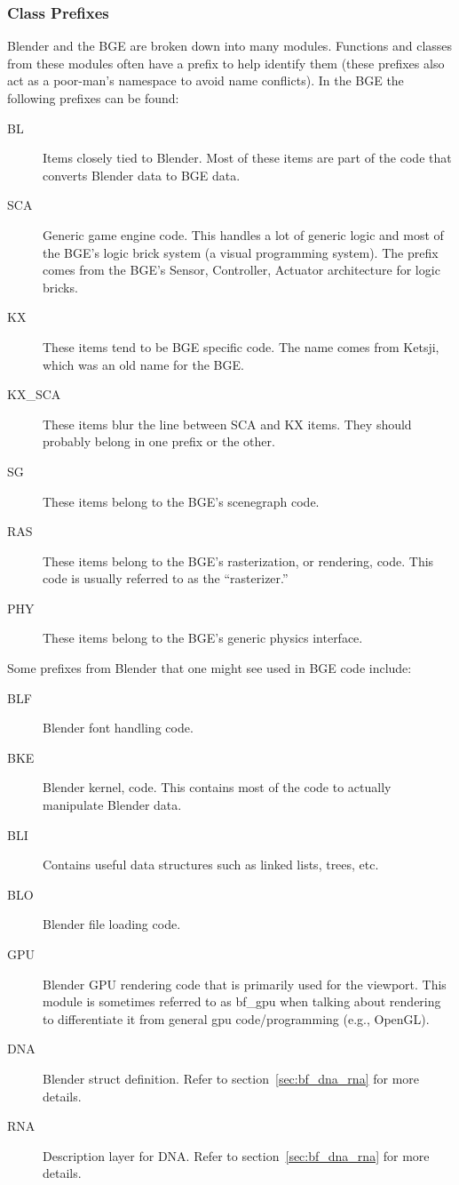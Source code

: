 \subsubsection{Class Prefixes}
Blender and the BGE are broken down into many modules.
Functions and classes from these modules often have a prefix to help identify them (these prefixes also act as a poor-man's namespace to avoid name conflicts).
In the BGE the following prefixes can be found:

\begin{description}
 \item[BL] Items closely tied to Blender. Most of these items are part of the code that converts Blender data to BGE data.
 \item[SCA] Generic game engine code. This handles a lot of generic logic and most of the BGE's logic brick system (a visual programming system). The prefix comes from the BGE's Sensor, Controller, Actuator architecture for logic bricks.
 \item [KX] These items tend to be BGE specific code. The name comes from Ketsji, which was an old name for the BGE.
 \item [KX\_SCA] These items blur the line between SCA and KX items. They should probably belong in one prefix or the other.
 \item [SG] These items belong to the BGE's scenegraph code.
 \item [RAS] These items belong to the BGE's rasterization, or rendering, code. This code is usually referred to as the ``rasterizer.''
 \item [PHY] These items belong to the BGE's generic physics interface.
\end{description}

Some prefixes from Blender that one might see used in BGE code include:

\begin{description}
 \item [BLF] Blender font handling code.
 \item [BKE] Blender kernel, code. This contains most of the code to actually manipulate Blender data.
 \item [BLI] Contains useful data structures such as linked lists, trees, etc.
 \item [BLO] Blender file loading code.
 \item [GPU] Blender GPU rendering code that is primarily used for the viewport. This module is sometimes referred to as bf\_gpu when talking about rendering to differentiate it from general gpu code/programming (e.g., OpenGL).
 \item [DNA] Blender struct definition. Refer to section~\ref{sec:bf_dna_rna} for more details.
 \item [RNA] Description layer for DNA. Refer to section~\ref{sec:bf_dna_rna} for more details.
\end{description}


